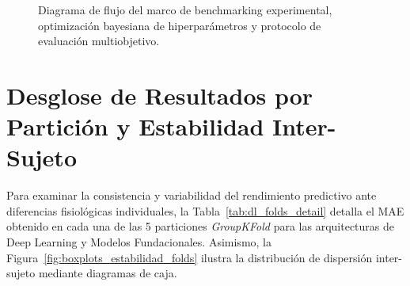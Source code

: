 \begin{figure}[H]
{%
    }
    \caption{Diagrama de flujo del marco de benchmarking experimental, optimización bayesiana de hiperparámetros y protocolo de evaluación multiobjetivo.}
    \label{fig:benchmarking_workflow_tikz}
\end{figure}

\clearpage

\section{Desglose de Resultados por Partición y Estabilidad Inter-Sujeto}
\label{sec:res_folds}

Para examinar la consistencia y variabilidad del rendimiento predictivo ante diferencias fisiológicas individuales, la Tabla~\ref{tab:dl_folds_detail} detalla el MAE obtenido en cada una de las 5 particiones \textit{GroupKFold} para las arquitecturas de Deep Learning y Modelos Fundacionales. Asimismo, la Figura~\ref{fig:boxplots_estabilidad_folds} ilustra la distribución de dispersión inter-sujeto mediante diagramas de caja.

